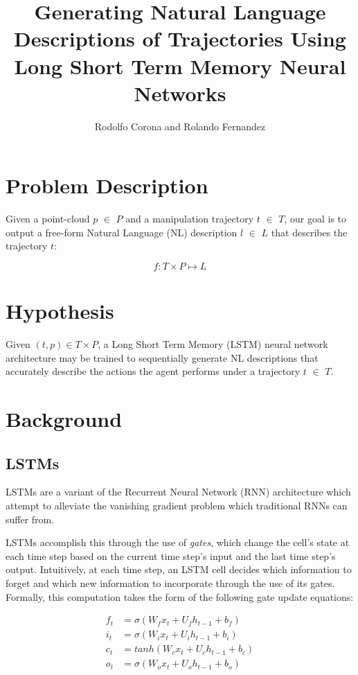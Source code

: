 \documentclass[letterpaper, 12 pt, conference]{ieeeconf}
\title{\LARGE \bf
Generating Natural Language Descriptions of Trajectories Using Long Short Term Memory Neural Networks}
\author{Rodolfo Corona and Rolando Fernandez}
\begin{document}
\maketitle
\thispagestyle{empty}
\pagestyle{empty}

\section{Problem Description}

Given a point-cloud $p$ $\in$ $P$ and a manipulation trajectory $t$ $\in$ $T$, our goal is to output a free-form  Natural Language (NL) description $l$ $\in$ $L$ that describes the trajectory $t$:

\begin{equation}
f: T\times P \mapsto L
\end{equation}

\section{Hypothesis}

Given $(t,p)\in T\times P$, a Long Short Term Memory (LSTM) neural network architecture may be trained to sequentially generate NL descriptions that accurately describe the actions the agent performs under a trajectory $t$ $\in$ $T$.

\section{Background}

\subsection{LSTMs}

LSTMs are a variant of the Recurrent Neural Network (RNN) architecture which attempt to alleviate the vanishing gradient problem which traditional RNNs can suffer from. 
\par
LSTMs accomplish this through the use of \textit{gates}, which change the cell's state at each time step based on the current time step's input and the last time step's output. Intuitively, at each time step, an LSTM cell decides which information to forget and which new information to incorporate through the use of its gates. Formally, this computation takes the form of the following gate update equations: 

\begin{align}
f_t &= \sigma (W_fx_t + U_fh_{t-1}+b_f) \\
i_t&=\sigma (W_ix_t + U_ih_{t-1}+b_i) \\
c_t &= tanh (W_cx_t  + U_c h_{t-1}+b_c) \\
o_t &= \sigma (W_o x_t + U_o h_{t-1} + b_o)
\end{align}
\end{document}
